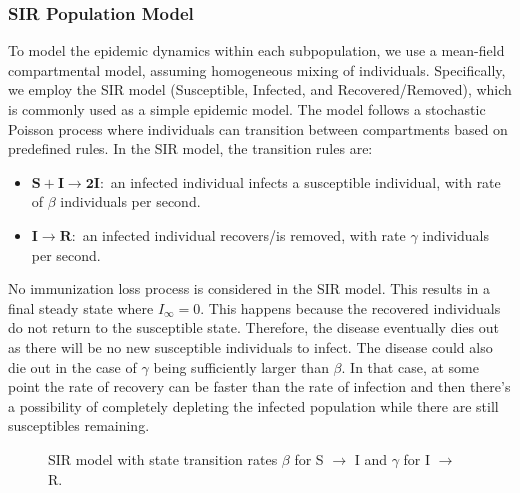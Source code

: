 \subsubsection{SIR Population Model}
To model the epidemic dynamics within each subpopulation, we use a mean-field compartmental model, assuming homogeneous mixing of individuals. Specifically, we employ the SIR model (Susceptible, Infected, and Recovered/Removed), which is commonly used as a simple epidemic model. The model follows a stochastic Poisson process where individuals can transition between compartments based on predefined rules. In the SIR model, the transition rules are:
\begin{itemize}
    \item $\mathbf{S + I \rightarrow 2I:}$ an infected individual infects a susceptible individual, with rate of $\beta$ individuals per second.
    \item $\mathbf{I \rightarrow R:}$ an infected individual recovers/is removed, with rate $\gamma$ individuals per second.
\end{itemize}

No immunization loss process is considered in the SIR model. This results in a final steady state where $I_\infty=0$. This happens because the recovered individuals do not return to the susceptible state. Therefore, the disease eventually dies out as there will be no new susceptible individuals to infect. The disease could also die out in the case of $\gamma$ being sufficiently larger than $\beta$. In that case, at some point the rate of recovery can be faster than the rate of infection and then there's a possibility of completely depleting the infected population while there are still susceptibles remaining.

\begin{figure}[ht]
    \centering
    \caption{SIR model with state transition rates $\beta$ for S $\rightarrow$ I and $\gamma$ for I $\rightarrow$ R.}
    \label{fig:SIR_stochastic_model}
\end{figure}

